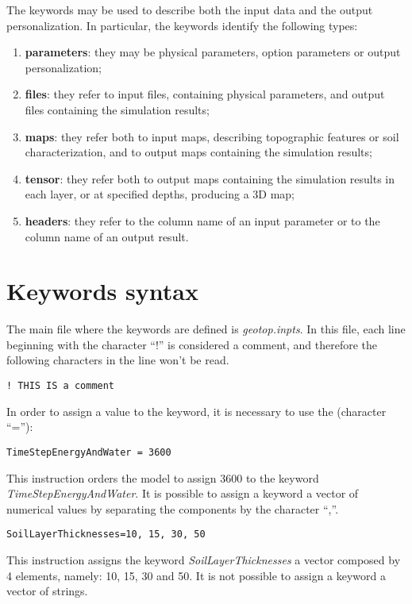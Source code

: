 \noindent The keywords may be used to describe both the input data and the output personalization. In particular, the keywords identify the following types:
\begin{enumerate}
\item {\bf parameters}: they may be physical parameters, option parameters or output personalization;
\item {\bf files}: they refer to input files, containing physical parameters, and output files containing the simulation results;
\item {\bf maps}: they refer both to input maps, describing topographic features or soil characterization, and to output maps containing the simulation results;
\item {\bf tensor}: they refer both to output maps containing the simulation results in each layer, or at specified depths, producing a 3D map;
\item {\bf headers}: they refer to the column name of an input parameter or to the column name of an output result.
\end{enumerate}

\section{Keywords syntax}
The main file where the keywords are defined is {\it geotop.inpts}. In this file, each line beginning with the character ``!'' is considered a comment, and therefore the following characters in the line won't be read.
\footnotesize{
\begin{verbatim}
! THIS IS a comment
\end{verbatim}
}


\noindent In order to assign a value to the keyword, it is necessary to use the (character ``=''):
\footnotesize{
\begin{verbatim}
TimeStepEnergyAndWater = 3600
\end{verbatim}
}
\noindent This instruction orders the model to assign 3600 to the keyword {\it TimeStepEnergyAndWater}. It is possible to assign a keyword a vector of numerical values by separating the components by the character ``,''. 
\footnotesize{
\begin{verbatim}
SoilLayerThicknesses=10, 15, 30, 50
\end{verbatim}
}
\noindent This instruction assigns the keyword {\it SoilLayerThicknesses} a vector composed by 4 elements, namely: 10, 15, 30 and 50. It is not possible to assign a keyword a vector of strings.\\

